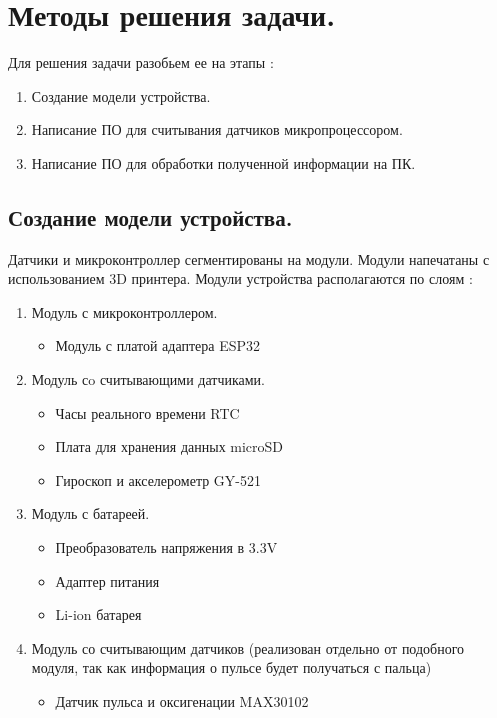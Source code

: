 \documentclass[a4document]{article}
\begin{document}
{
\newpage
\section*{Методы решения задачи.} 
\bigbreak
Для решения задачи разобьем ее на этапы : 
\begin{enumerate}
    \item Создание модели устройства.
    \item Написание ПО для считывания датчиков микропроцессором.
    \item Написание ПО для обработки полученной информации на ПК.
\end{enumerate}

\subsection*{Создание модели устройства.}
{
Датчики и микроконтроллер сегментированы на модули. Модули напечатаны с использованием 3D принтера. 
Модули устройства располагаются по слоям : 
\begin{enumerate}
    \item Модуль с микроконтроллером.
        \begin{itemize}
            \item Модуль с платой адаптера ESP32
        \end{itemize}
    \item Модуль сo считывающими датчиками. 
        \begin{itemize}
            \item Часы реального времени RTC
            \item Плата для хранения данных microSD
            \item Гироскоп и акселерометр GY-521
        \end{itemize}
    \item Модуль с батареей.
        \begin{itemize}
            \item Преобразователь напряжения в 3.3V
            \item Адаптер питания
            \item Li-ion батарея
        \end{itemize}
    \item Модуль со считывающим датчиков (реализован отдельно от подобного модуля, 
            так как информация о пульсе будет получаться с пальца)
        \begin{itemize}
            \item Датчик пульса и оксигенации MAX30102
        \end{itemize}
\end{enumerate}

}}
\end{document}
